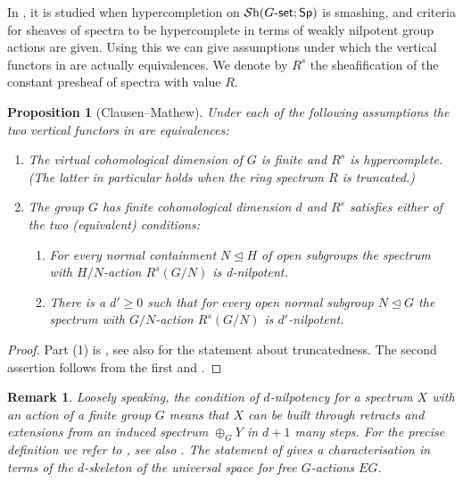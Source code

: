 \documentclass[reqno]{amsart}
\numberwithin{equation}{section}\theoremstyle{thms}
\newtheorem{prop}[equation]{Proposition}
\theoremstyle{defn}
\newtheorem{rem}[equation]{Remark}
\newcommand{\tn}[1]{\textnormal{#1}}
\newcommand{\tsf}[1]{\textsf{\textup{#1}}}
\newcommand{\mcal}[1]{\mathcal{#1}}
\newcommand{\sheaves}{\mcal{S}\tn{h}}
\newcommand{\spec}{\tsf{Sp}}
\newcommand{\gset}{G\tsf{-set}}
\begin{document}
In \cite[§4.1]{cm21}, it is studied when hypercompletion on $\sheaves(\gset;\spec)$ is smashing, and criteria for sheaves of spectra to be hypercomplete in terms of weakly nilpotent group actions are given. Using this we can give assumptions under which the vertical functors in  are actually equivalences. We denote by $R^s$ the sheafification of the constant presheaf of spectra with value $R$. 

\begin{prop}[Clausen--Mathew]\label{prop:smashinghypercompletion}
Under each of the following assumptions the two vertical functors in  are equivalences:
\begin{enumerate}
    \item The virtual cohomological dimension of $G$ is finite and $R^s$ is hypercomplete. (The latter in particular holds when the ring spectrum $R$ is truncated.)
    \item The group $G$ has finite cohomological dimension $d$ and $R^s$ satisfies either of the two (equivalent) conditions:
    \begin{enumerate}
        \item For every normal containment $N \unlhd H$ of open subgroups the spectrum with $H/N$-action $R^s(G/N)$ is d-nilpotent.
        \item There is a $d' \geq 0$ such that for every open normal subgroup $N \unlhd G$ the spectrum with $G/N$-action $R^s(G/N)$ is $d'$-nilpotent.
    \end{enumerate}
\end{enumerate}
\end{prop}
\begin{proof}
Part (1) is \cite[Corollary 4.28]{cm21}, see also \cite[Corollary 4.29]{cm21} for the statement about truncatedness. The second assertion follows from the first and \cite[Theorem 4.26]{cm21}.
\end{proof}

\begin{rem}
Loosely speaking, the condition of $d$-nilpotency for a spectrum $X$ with an action of a finite group $G$ means that $X$ can be built through retracts and extensions from an induced spectrum $\oplus_G Y$ in $d+1$ many steps. For the precise definition we refer to \cite[Definition 4.18]{cm21}, see also \cite{mnn17,mnn19}. The statement of \cite[Lemma 4.20]{cm21} gives a characterisation in terms of the $d$-skeleton of the universal space for free $G$-actions $EG$.
\end{rem}
\end{document}
